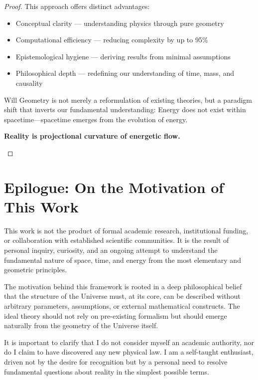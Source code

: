 \documentclass{article}
\begin{document}
\begin{theorem}
\begin{proof}
This approach offers distinct advantages:
\begin{itemize}
\item Conceptual clarity — understanding physics through pure geometry
\item Computational efficiency — reducing complexity by up to 95\%
\item Epistemological hygiene — deriving results from minimal assumptions
\item Philosophical depth — redefining our understanding of time, mass, and causality
\end{itemize}

Will Geometry is not merely a reformulation of existing theories, but a paradigm shift that inverts our fundamental understanding: Energy does not exist within spacetime—spacetime emerges from the evolution of energy.

\begin{tcolorbox}[colback=gray!5, colframe=black!80!black, title=Final Principle]
\textbf{Reality is projectional curvature of energetic flow.}
\end{tcolorbox}
\end{proof}

\section{Epilogue: On the Motivation of This Work}

This work is not the product of formal academic research, institutional funding, or collaboration with established scientific communities. It is the result of personal inquiry, curiosity, and an ongoing attempt to understand the fundamental nature of space, time, and energy from the most elementary and geometric principles.

The motivation behind this framework is rooted in a deep philosophical belief that the structure of the Universe must, at its core, can be described without arbitrary parameters, assumptions, or external mathematical constructs. The ideal theory should not rely on pre-existing formalism but should emerge naturally from the geometry of the Universe itself.

It is important to clarify that I do not consider myself an academic authority, nor do I claim to have discovered any new physical law. I am a self-taught enthusiast, driven not by the desire for recognition but by a personal need to resolve fundamental questions about reality in the simplest possible terms.


\end{theorem}
\end{document}

